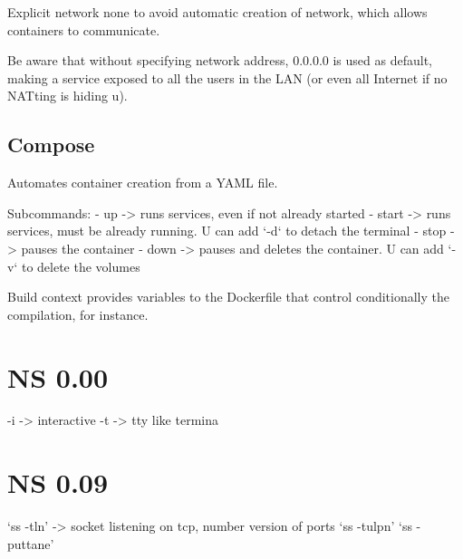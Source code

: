 Explicit network none to avoid automatic creation of network, which allows containers to communicate.

Be aware that without specifying network address, 0.0.0.0 is used as default, making a service exposed to all the users in the LAN (or even all Internet if no NATting is hiding u).

\subsection{Compose}
Automates container creation from a YAML file.

Subcommands:
 - up -> runs services, even if not already started
 - start -> runs services, must be already running. U can add `-d` to detach the terminal
 - stop -> pauses the container
 - down -> pauses and deletes the container. U can add `-v` to delete the volumes

Build context provides variables to the Dockerfile that control conditionally the compilation, for instance.

\section{NS 0.00}
-i -> interactive
-t -> tty like termina

\section{NS 0.09}
`ss -tln' -> socket listening on tcp, number version of ports
`ss -tulpn'
`ss -puttane'